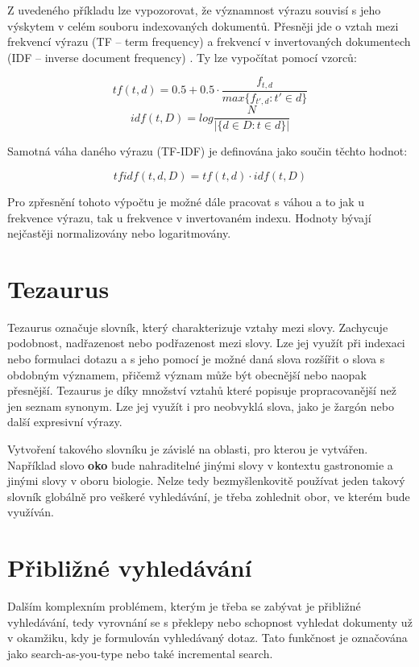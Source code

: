 \documentclass[FM,DP]{tulthesis}
\begin{document}
Z uvedeného příkladu lze vypozorovat, že významnost výrazu souvisí s jeho výskytem v celém
souboru indexovaných dokumentů. Přesněji jde o vztah mezi frekvencí výrazu (TF -- term frequency) 
a frekvencí v invertovaných dokumentech (IDF -- inverse document frequency) \cite[strana~21]{strossa}. 
Ty lze vypočítat pomocí vzorců:

\[tf(t,d) = 0.5 + 0.5 \cdot \frac{f_{t,d}}{max\{f_{{t}',d}:{t}'\in d\}}\]
\vspace{1mm}
\[idf(t,D)=log \frac{N}{\left | \{d\in D:t\in d\} \right |}\]
\vspace{1mm}

Samotná váha daného výrazu (TF-IDF) je definována jako součin těchto hodnot:

\vspace{1mm}
\[tfidf(t,d,D) = tf(t,d) \cdot idf(t,D)\]
\vspace{0mm}

Pro zpřesnění tohoto výpočtu je možné dále pracovat s váhou a to jak u frekvence výrazu, 
tak u frekvence v invertovaném indexu. Hodnoty bývají nejčastěji normalizovány nebo
logaritmovány.

\section{Tezaurus}

Tezaurus označuje slovník, který charakterizuje vztahy mezi slovy. Zachycuje podobnost, 
nadřazenost nebo podřazenost mezi slovy. Lze jej využít při indexaci nebo formulaci 
dotazu a s jeho pomocí je možné daná slova rozšířit o slova s obdobným významem, 
přičemž význam může být obecnější nebo naopak přesnější. Tezaurus je díky množství
vztahů které popisuje propracovanější než jen seznam synonym. Lze jej využít 
i pro neobvyklá slova, jako je žargón nebo další expresivní výrazy.

Vytvoření takového slovníku je závislé na oblasti, pro kterou je vytvářen. Například 
slovo \textbf{oko} bude nahraditelné jinými slovy v kontextu gastronomie a jinými 
slovy v oboru biologie. Nelze tedy bezmyšlenkovitě používat jeden takový slovník globálně 
pro veškeré vyhledávání, je třeba zohlednit obor, ve kterém bude využíván.

\section{Přibližné vyhledávání}

Dalším komplexním problémem, kterým je třeba se zabývat je přibližné vyhledávání, tedy
vyrovnání se s překlepy nebo schopnost vyhledat dokumenty už v okamžiku, kdy je formulován
vyhledávaný dotaz. Tato funkčnost je označována jako search-as-you-type nebo také
incremental search.
\end{document}
